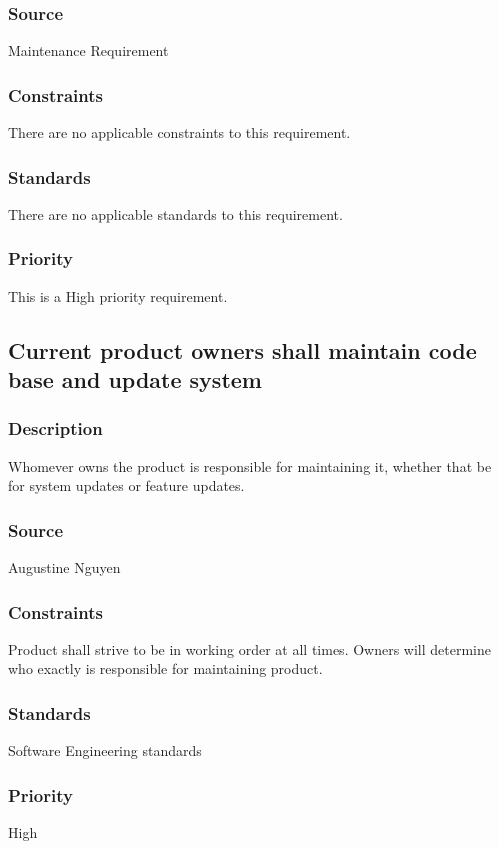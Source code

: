 \subsubsection{Source}
Maintenance Requirement
\subsubsection{Constraints}
There are no applicable constraints to this requirement.
\subsubsection{Standards}
There are no applicable standards to this requirement.
\subsubsection{Priority}
This is a High priority requirement.

\subsection{Current product owners shall maintain code base and update system}
\subsubsection{Description}
Whomever owns the product is responsible for maintaining it, whether that be for system updates or feature updates.
\subsubsection{Source}
Augustine Nguyen
\subsubsection{Constraints}
Product shall strive to be in working order at all times.  Owners will determine who exactly is responsible for maintaining product.
\subsubsection{Standards}
Software Engineering standards
\subsubsection{Priority}
High
